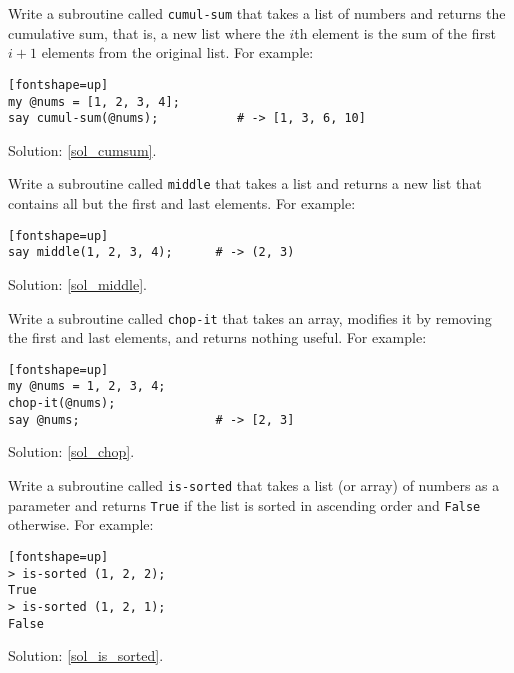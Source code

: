 \begin{exercise}
\label{cumulative}

Write a subroutine called {\tt cumul-sum} that takes a list of numbers 
and returns the cumulative sum, that is, a new list where the 
$i$th element is the sum of the first $i+1$ elements from 
the original list. For example:
\label{cumsum}

\begin{verbatim}[fontshape=up]
my @nums = [1, 2, 3, 4];
say cumul-sum(@nums);           # -> [1, 3, 6, 10]
\end{verbatim}

Solution: \ref{sol_cumsum}.

\end{exercise}

\begin{exercise}

Write a subroutine called \verb"middle" that takes a list and
returns a new list that contains all but the first and last
elements.  For example:
\label{middle}

\begin{verbatim}[fontshape=up]
say middle(1, 2, 3, 4);      # -> (2, 3)
\end{verbatim}

Solution: \ref{sol_middle}.

\end{exercise}

\begin{exercise}

Write a subroutine called \verb"chop-it" that takes 
an array, modifies it by removing the first and last 
elements, and returns nothing useful. For example:
\label{chop}

\begin{verbatim}[fontshape=up]
my @nums = 1, 2, 3, 4;
chop-it(@nums);
say @nums;                   # -> [2, 3]
\end{verbatim}

Solution: \ref{sol_chop}.

\end{exercise}


\begin{exercise}
Write a subroutine called \verb"is-sorted" that takes 
a list (or array) of numbers as a parameter and returns 
{\tt True} if the list is sorted in ascending order and 
{\tt False} otherwise.  For example:
\label{is_sorted}

\begin{verbatim}[fontshape=up]
> is-sorted (1, 2, 2);
True
> is-sorted (1, 2, 1);
False
\end{verbatim}

Solution: \ref{sol_is_sorted}.

\end{exercise}


